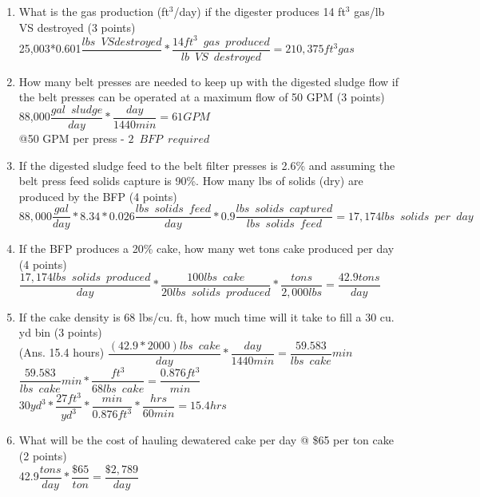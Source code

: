 \begin{enumerate}
\begin{enumerate}
\item What is the gas production (ft$^3$/day) if the digester produces 14 ft$^3$ gas/lb VS destroyed (3 points)\\
25,003*0.601$\dfrac{lbs\enspace VS destroyed}{}*\dfrac{14ft^3 \enspace gas \enspace produced}{lb \enspace VS \enspace destroyed}=\boxed{210,375ft^3 gas}$
\\
\vspace{2cm}

\item How many belt presses are needed to keep up with the digested sludge flow if the belt presses can be operated at a maximum flow of 50 GPM (3 points)\\

88,000$\dfrac{gal \enspace sludge}{day}*\dfrac{day}{1440min}=61 GPM$\\
@50 GPM per press - $\boxed{2 \enspace BFP \enspace required}$
\vspace{2cm}
\item If the digested sludge feed to the belt filter presses is 2.6\% and assuming the belt press feed solids capture is 90\%.  How many lbs of solids (dry) are produced by the BFP (4 points)\\
$88,000\dfrac{gal}{day}*8.34*0.026\dfrac{lbs \enspace solids \enspace feed}{day}*0.9\dfrac{lbs \enspace solids \enspace captured}{lbs \enspace solids \enspace feed}=\boxed{17,174 lbs \enspace solids \enspace per \enspace day}$
\vspace{2cm}

\item If the BFP produces a 20\% cake, how many wet tons cake produced per day (4 points)\\
$\dfrac{17,174 lbs \enspace solids \enspace produced}{day}*\dfrac{100 lbs \enspace cake}{20 lbs \enspace solids \enspace produced}*\dfrac{tons}{2,000 lbs}=\boxed{\dfrac{42.9tons}{day}}$
\vspace{2cm}

\item If the cake density is 68 lbs/cu. ft, how much time will it take to fill a 30 cu. yd bin (3 points)\\
(Ans. 15.4 hours)
$\dfrac{(42.9*2000)lbs \enspace cake}{day}*\dfrac{day}{1440 min}=\dfrac{59.583}{lbs \enspace cake}{min}$\\
$\dfrac{59.583}{lbs \enspace cake}{min}*\dfrac{ft^3}{68 lbs \enspace cake}=\dfrac{0.876ft^3}{min}$\\
$30yd^3*\dfrac{27ft^3}{yd^3}*\dfrac{min}{0.876ft^3}*\dfrac{hrs}{60 min}=\boxed{15.4hrs}$
\vspace{2cm}
\item What will be the cost of hauling dewatered cake per day @ \$65 per ton cake (2 points)\\
42.9$\dfrac{tons}{day}*\dfrac{\$65}{ton}=\boxed{\dfrac{\$2,789}{day}}$ 
\end{enumerate}


\end{enumerate}
